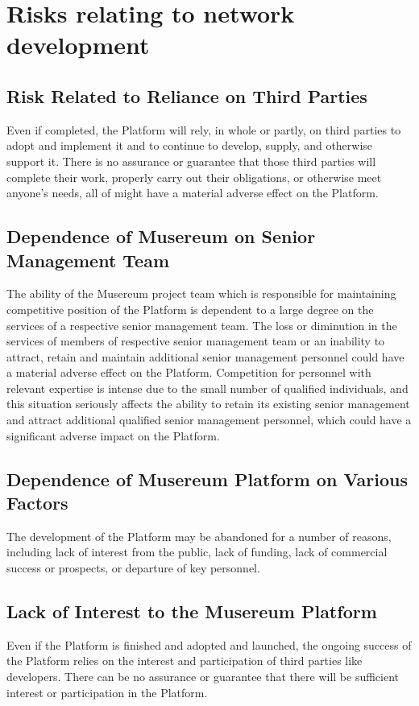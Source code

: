 \documentclass[12pt]{report}
\begin{document}
\section{Risks relating to network development}
\subsection*{Risk Related to Reliance on Third Parties}
Even if completed, the Platform will rely, in whole or partly, on third parties to adopt and implement it and to continue to develop, supply, and otherwise support it. There is no assurance or guarantee that those third parties will complete their work, properly carry out their obligations, or otherwise meet anyone’s needs, all of might have a material adverse effect on the Platform.

\subsection*{Dependence of Musereum on Senior Management Team}
The ability of the Musereum project team which is responsible for maintaining competitive position of the Platform is dependent to a large degree on the services of a respective senior management team. The loss or diminution in the services of members of respective senior management team or an inability to attract, retain and maintain additional senior management personnel could have a material adverse effect on the Platform. Competition for personnel with relevant expertise is intense due to the small number of qualified individuals, and this situation seriously affects the ability to retain its existing senior management and attract additional qualified senior management personnel, which could have a significant adverse impact on the Platform.

\subsection*{Dependence of Musereum Platform on Various Factors}
The development of the Platform may be abandoned for a number of reasons, including lack of interest from the public, lack of funding, lack of commercial success or prospects, or departure of key personnel.

\subsection*{Lack of Interest to the Musereum Platform}
Even if the Platform is finished and adopted and launched, the ongoing success of the Platform relies on the interest and participation of third parties like developers. There can be no assurance or guarantee that there will be sufficient interest or participation in the Platform.
\end{document}

